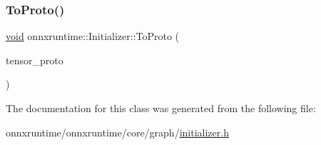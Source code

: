 \mbox{\label{classonnxruntime_1_1Initializer_aae8fbd8bbac151face5adbabd79afff7}} 
\subsubsection{\texorpdfstring{To\+Proto()}{ToProto()}}
{\footnotesize\ttfamily \mbox{\hyperlink{mlasi_8h_a88f941d423cb2a819b70a1358982b1a6}{void}} onnxruntime\+::\+Initializer\+::\+To\+Proto (\begin{DoxyParamCaption}\item[{O\+N\+N\+X\+\_\+\+N\+A\+M\+E\+S\+P\+A\+C\+E\+::\+Tensor\+Proto $\ast$}]{tensor\+\_\+proto }\end{DoxyParamCaption})\hspace{0.3cm}{\ttfamily [inline]}}



The documentation for this class was generated from the following file\+:\begin{DoxyCompactItemize}
\item 
onnxruntime/onnxruntime/core/graph/\mbox{\hyperlink{initializer_8h}{initializer.\+h}}\end{DoxyCompactItemize}
